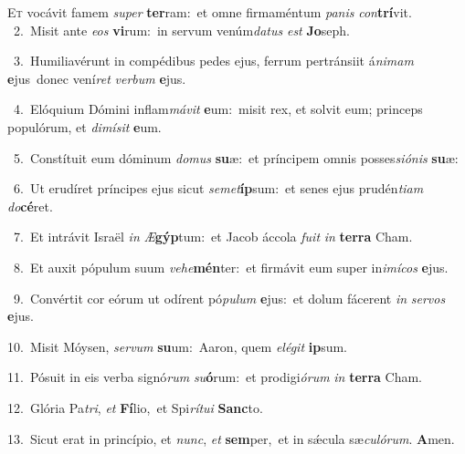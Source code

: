 \lettrine{\initial\textcolor{\initialcolor}{E}}{t} vocávit famem \textit{su}\-\textit{per} \textbf{ter}\-ram:~\star et omne firmaméntum \textit{pa}\-\textit{nis} \textit{con}\-\textbf{trí}vit.\\
{\numbfont\textcolor{\numbcolor}{~2.}}~Misit ante \textit{e}\-\textit{os} \textbf{vi}\-rum:~\star in servum venúm\-\textit{da}\-\textit{tus} \textit{est} \textbf{Jo}\-seph.\par
{\numbfont\textcolor{\numbcolor}{~3.}}~Humiliavérunt in compédibus pedes ejus, ferrum pertránsiit á\-\textit{ni}\-\textit{mam} \textbf{e}\-jus~\star donec vení\textit{ret} \textit{ver}\-\textit{bum} \textbf{e}\-jus.\par
{\numbfont\textcolor{\numbcolor}{~4.}}~Elóquium Dómini inflam\-\textit{má}\-\textit{vit} \textbf{e}\-um:~\star misit rex, et solvit eum; princeps populórum, et \textit{di}\-\textit{mí}\textit{sit} \textbf{e}\-um.\par
{\numbfont\textcolor{\numbcolor}{~5.}}~Constítuit eum dóminum \textit{do}\-\textit{mus} \textbf{su}\-æ:~\star et príncipem omnis posses\-\textit{si}\-\textit{ó}\textit{nis} \textbf{su}\-æ:\par
{\numbfont\textcolor{\numbcolor}{~6.}}~Ut erudíret príncipes ejus sicut \textit{se}\-\textit{met}\textbf{íp}sum:~\star et senes ejus prudén\-\textit{ti}\-\textit{am} \textit{do}\-\textbf{cé}ret.\par
{\numbfont\textcolor{\numbcolor}{~7.}}~Et intrávit Israël \textit{in} \textit{Æ}\-\textbf{gýp}tum:~\star et Jacob áccola \textit{fu}\-\textit{it} \textit{in} \textbf{ter}\-\textbf{ra} Cham.\par
{\numbfont\textcolor{\numbcolor}{~8.}}~Et auxit pópulum suum \textit{ve}\-\textit{he}\textbf{mén}ter:~\star et firmávit eum super in\-\textit{i}\-\textit{mí}\textit{cos} \textbf{e}\-jus.\par
{\numbfont\textcolor{\numbcolor}{~9.}}~Convértit cor eórum ut odírent pó\-\textit{pu}\-\textit{lum} \textbf{e}\-jus:~\star et dolum fácerent \textit{in} \textit{ser}\-\textit{vos} \textbf{e}\-jus.\par
{\numbfont\textcolor{\numbcolor}{10.}}~Misit Móysen, \textit{ser}\-\textit{vum} \textbf{su}\-um:~\star Aaron, quem \textit{e}\-\textit{lé}\textit{git} \textbf{ip}\-sum.\par
{\numbfont\textcolor{\numbcolor}{11.}}~Pósuit in eis verba signó\textit{rum} \textit{su}\-\textbf{ó}rum:~\star et prodigi\-\textit{ó}\-\textit{rum} \textit{in} \textbf{ter}\-\textbf{ra} Cham.\par
{\numbfont\textcolor{\numbcolor}{12.}}~Glória Pa\-\textit{tri}\-, \textit{et} \textbf{Fí}\-lio,~\star et Spi\-\textit{rí}\-\textit{tu}\textit{i} \textbf{Sanc}\-to.\par
{\numbfont\textcolor{\numbcolor}{13.}}~Sicut erat in princípio, et \textit{nunc}\-, \textit{et} \textbf{sem}\-per,~\star et in sǽcula sæ\-\textit{cu}\-\textit{ló}\textit{rum}. \textbf{A}\-men.\par
